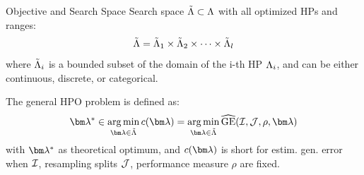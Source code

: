 \documentclass[11pt,compress,t,notes=noshow, xcolor=table]{beamer}
\begin{document}
\begin{vbframe}{Objective and Search Space}
Search space $\tilde{\Lambda} \subset \Lambda$ with all optimized HPs and ranges:
$$\tilde{\Lambda} = \tilde{\Lambda}_1 \times \tilde{\Lambda}_2 \times \dots \times \tilde{\Lambda}_l$$
 where $\tilde{\Lambda}_i$ is a bounded subset of the domain of the i-th HP $\Lambda_i$, and can be either continuous, discrete, or categorical.


\vspace{1cm}

The general HPO problem is defined as:
\begin{eqnarray*}
    \lams \in \argmin_{\lamv \in \LamS} \clam = \argmin_{\lamv \in \LamS}
    \GEhresa
\end{eqnarray*}
with $\lams$ as theoretical optimum, and $\clam$ is short for estim. gen. error
when $\mathcal{I}$, resampling splits $\mathcal{J}$, performance measure $\rho$ are fixed.
\end{vbframe}

\end{document}
